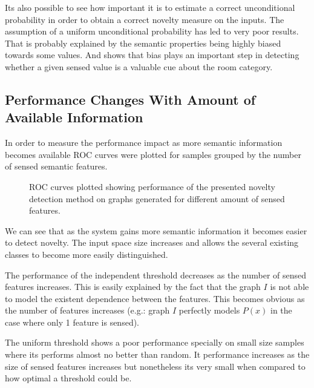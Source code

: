 Its also possible to see how important it is to estimate a correct unconditional
probability in order to obtain a correct novelty measure on the inputs.
The assumption of a uniform unconditional probability has led to very poor results.
That is probably explained by the semantic properties being highly
biased towards some values. And shows that bias plays an important step
in detecting whether a given sensed value is a valuable cue about the room category.



\subsection{Performance Changes With Amount of Available Information}
In order to measure the performance impact as more semantic information becomes
available ROC curves were plotted for samples grouped by the number of sensed
semantic features.

\begin{figure}[h]
\centering

\qquad
{}

\qquad
{}

\caption{\label{fig:synthetic-roc-breakdown}ROC curves plotted showing performance of the
         presented novelty detection method on graphs generated for different amount of
         sensed features.}
\end{figure}

We can see that as the system gains more semantic information it becomes easier
to detect novelty. The input space size increases and allows the several existing
classes to become more easily distinguished.

The performance of the independent threshold decreases as the number of sensed
features increases. This is easily explained by the fact that the graph $I$ is not
able to model the existent dependence between the features. This becomes obvious
as the number of features increases (e.g.: graph $I$ perfectly models $P(x)$ in the
case where only 1 feature is sensed).

The uniform threshold shows a poor performance specially on small size samples
where its performs almost no better than random.
It performance increases as the size of sensed features increases but nonetheless
its very small when compared to how optimal a threshold could be.



